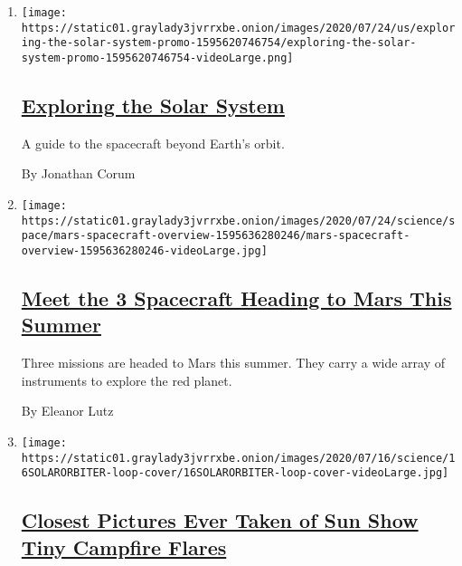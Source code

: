 \begin{enumerate}
\def\labelenumi{\arabic{enumi}.}
\item
  \texttt{[image: https://static01.graylady3jvrrxbe.onion/images/2020/07/24/us/exploring-the-solar-system-promo-1595620746754/exploring-the-solar-system-promo-1595620746754-videoLarge.png]}

  \hypertarget{exploring-the-solar-system}{%
  \subsection{\texorpdfstring{\href{/interactive/2020/science/exploring-the-solar-system.html}{Exploring
  the Solar
  System}}{Exploring the Solar System}}\label{exploring-the-solar-system}}

  A guide to the spacecraft beyond Earth's orbit.

  By Jonathan Corum
\item
  \texttt{[image: https://static01.graylady3jvrrxbe.onion/images/2020/07/24/science/space/mars-spacecraft-overview-1595636280246/mars-spacecraft-overview-1595636280246-videoLarge.jpg]}

  \hypertarget{meet-the-3-spacecraft-heading-to-mars-this-summer}{%
  \subsection{\texorpdfstring{\href{/interactive/2020/science/mars-perseverance-tianwen-hope.html}{Meet
  the 3 Spacecraft Heading to Mars This
  Summer}}{Meet the 3 Spacecraft Heading to Mars This Summer}}\label{meet-the-3-spacecraft-heading-to-mars-this-summer}}

  Three missions are headed to Mars this summer. They carry a wide array
  of instruments to explore the red planet.

  By Eleanor Lutz
\item
  \texttt{[image: https://static01.graylady3jvrrxbe.onion/images/2020/07/16/science/16SOLARORBITER-loop-cover/16SOLARORBITER-loop-cover-videoLarge.jpg]}

  \hypertarget{closest-pictures-ever-taken-of-sun-show-tiny-campfire-flares}{%
  \subsection{\texorpdfstring{\href{/2020/07/16/science/solar-orbiter-sun-images.html}{Closest
  Pictures Ever Taken of Sun Show Tiny Campfire
  Flares}}{Closest Pictures Ever Taken of Sun Show Tiny Campfire Flares}}\label{closest-pictures-ever-taken-of-sun-show-tiny-campfire-flares}}


\end{enumerate}

